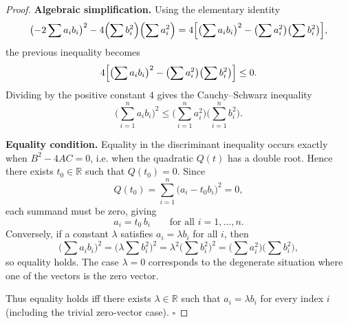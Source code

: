 \begin{proof}
\medskip
\textbf{Algebraic simplification.}
Using the elementary identity
\[
\bigl(-2\sum a_{i}b_{i}\bigr)^{2}
-4\Bigl(\sum b_{i}^{2}\Bigr)\Bigl(\sum a_{i}^{2}\Bigr)
=4\Bigl[\bigl(\sum a_{i}b_{i}\bigr)^{2}
      -\bigl(\sum a_{i}^{2}\bigr)\bigl(\sum b_{i}^{2}\bigr)\Bigr],
\]
the previous inequality becomes
\[
4\Bigl[\bigl(\sum a_{i}b_{i}\bigr)^{2}
      -\bigl(\sum a_{i}^{2}\bigr)\bigl(\sum b_{i}^{2}\bigr)\Bigr]\le0.
\]
Dividing by the positive constant \(4\) gives the Cauchy–Schwarz inequality
\[
\boxed{\displaystyle
\bigl(\sum_{i=1}^{n}a_{i}b_{i}\bigr)^{2}
\le
\bigl(\sum_{i=1}^{n}a_{i}^{2}\bigr)
\bigl(\sum_{i=1}^{n}b_{i}^{2}\bigr)}.
\]

\medskip
\textbf{Equality condition.}
Equality in the discriminant inequality occurs exactly when
\(B^{2}-4AC=0\), i.e. when the quadratic \(Q(t)\) has a double root.
Hence there exists \(t_{0}\in\mathbb{R}\) such that \(Q(t_{0})=0\).
Since
\[
Q(t_{0})=\sum_{i=1}^{n}\bigl(a_{i}-t_{0}b_{i}\bigr)^{2}=0,
\]
each summand must be zero, giving
\[
a_{i}=t_{0}\,b_{i}\qquad\text{for all }i=1,\dots ,n.
\]
Conversely, if a constant \(\lambda\) satisfies \(a_{i}=\lambda b_{i}\) for
all \(i\), then
\[
\bigl(\sum a_{i}b_{i}\bigr)^{2}
=\bigl(\lambda\sum b_{i}^{2}\bigr)^{2}
=\lambda^{2}\bigl(\sum b_{i}^{2}\bigr)^{2}
=\bigl(\sum a_{i}^{2}\bigr)\bigl(\sum b_{i}^{2}\bigr),
\]
so equality holds.  The case \(\lambda=0\) corresponds to the
degenerate situation where one of the vectors is the zero vector.

Thus equality holds iff there exists \(\lambda\in\mathbb{R}\) such that
\(a_{i}=\lambda b_{i}\) for every index \(i\) (including the trivial
zero‑vector case). \(\square\)
\end{proof}
